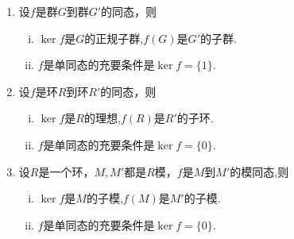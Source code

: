 \documentclass[../../main.tex]{subfiles}%
\begin{document}
\begin{proposition}\label{proposition:群同态的核是定义域的子群,像是陪域的子群-抽象代数}
\begin{enumerate}[(1)]
\item\label{proposition:群同态的核是定义域的子群,像是陪域的子群-抽象代数-1} 设$f$是群$G$到群$G'$的同态，则
\begin{enumerate}[(i)]
\item\label{proposition:群同态的核是定义域的子群,像是陪域的子群-抽象代数-1-1} $\ker f$是$G$的正规子群,$f(G)$是$G'$的子群.

\item\label{proposition:群同态的核是定义域的子群,像是陪域的子群-抽象代数-1-2} $f$是单同态的充要条件是$\ker f = \{1\}$.
\end{enumerate}

\item\label{proposition:群同态的核是定义域的子群,像是陪域的子群-抽象代数-2} 设$f$是环$R$到环$R'$的同态，则
\begin{enumerate}[(i)]
\item\label{proposition:群同态的核是定义域的子群,像是陪域的子群-抽象代数-2-1} $\ker f$是$R$的理想,$f(R)$是$R'$的子环.

\item\label{proposition:群同态的核是定义域的子群,像是陪域的子群-抽象代数-2-2} $f$是单同态的充要条件是$\ker f = \{0\}$.
\end{enumerate}

\item\label{proposition:群同态的核是定义域的子群,像是陪域的子群-抽象代数-3} 设$R$是一个环，$M, M'$都是$R$模，$f$是$M$到$M'$的模同态,则
\begin{enumerate}[(i)]
\item\label{proposition:群同态的核是定义域的子群,像是陪域的子群-抽象代数-3-1} $\ker f$是$M$的子模,$f(M)$是$M'$的子模.

\item\label{proposition:群同态的核是定义域的子群,像是陪域的子群-抽象代数-3-2} $f$是单同态的充要条件是$\ker f = \{0\}$.
\end{enumerate}
\end{enumerate}
\end{proposition}
\end{document}
